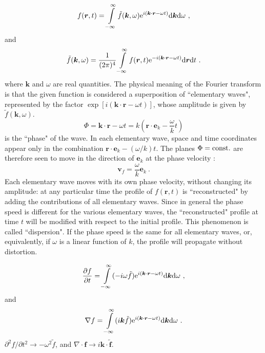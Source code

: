 \documentclass[12pt,a4paper]{article}
\renewcommand{\vec}[1]{\boldsymbol{#1}}
\newcommand{\dif}{\mathrm{d}}
\begin{document}
\begin{equation}
f(\vec{r}, t) = \int\limits_{-\infty}^{\infty} \tilde{f}(\vec{k}, \omega){\rm e}^{i(\vec{k}\cdot \vec{r} -\omega t)} \dif \vec{k} \dif \omega ~,
\end{equation}
and 
\begin{equation}
\tilde{f}(\vec{k}, \omega) = \frac{1}{(2\pi)^4} \int\limits_{-\infty}^{\infty} f(\vec{r}, t){\rm e}^{-i(\vec{k}\cdot \vec{r} -\omega t)} \dif \vec{r} \dif t ~.
\end{equation}
where $\vec{k}$ and $\omega$ are real quantities. The physical meaning of the Fourier transform is that the given
function is considered a superposition of ``elementary waves", represented by the factor $\exp [i(\vec{k}\cdot \vec{r} -\omega t)]$, whose amplitude is given by $\tilde{f}(\vec{k}, \omega)$.
\begin{equation}
\Phi = \vec{k}\cdot \vec{r} -\omega t = k\left(\vec{r}\cdot \vec{e}_k -\frac{\omega}{k} t \right)
\end{equation}
is the ``phase" of the wave. In each elementary wave, space and time coordinates appear only in the combination $\vec{r}\cdot \vec{e}_k−(\omega/k)t$. The planes $\Phi = {\rm const.}$ are therefore seen to move in the direction of $\vec{e}_k$ at the phase velocity :
\begin{equation}
\vec{v}_f = \frac{\omega}{k} \vec{e}_k ~.
\end{equation}
Each elementary wave moves with its own phase velocity, without changing its amplitude: at any particular time the profile of $f(\vec{r}, t)$ is ``reconstructed" by adding the contributions of all elementary waves. Since in general the phase speed is different for the various elementary waves, the ``reconstructed" profile at time $t$ will be modified with respect to the initial profile. This phenomenon is called ``dispersion". If the phase speed is the same for all elementary waves, or, equivalently, if $\omega$ is a linear function of $k$, the profile will propagate without distortion.

\begin{equation*}
\frac{\partial f}{\partial t} = \int\limits_{-\infty}^{\infty} (-i\omega \tilde{f}) {\rm e}^{i(\vec{k}\cdot \vec{r} -\omega t)} \dif \vec{k} \dif \omega ~,
\end{equation*}
and 
\begin{equation*}
\nabla f = \int\limits_{-\infty}^{\infty} (i\vec{k} \tilde{f}) {\rm e}^{i(\vec{k}\cdot \vec{r} -\omega t)} \dif \vec{k} \dif \omega ~.
\end{equation*}
$\partial^2 f/\partial t^2 \rightarrow -\omega^2 \tilde{f}$, and $\nabla \cdot \vec{f} \rightarrow i\vec{k}\cdot \vec{\tilde{f}}$.
\end{document}
